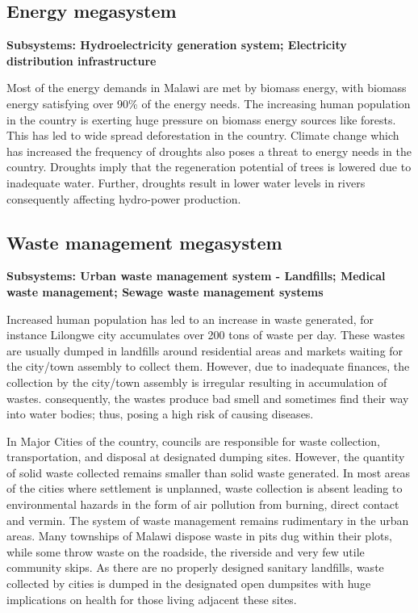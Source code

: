 \documentclass[
]{book}
\begin{document}
\hypertarget{energy-megasystem}{%
\subsection{Energy megasystem}\label{energy-megasystem}}

\textbf{Subsystems: Hydroelectricity generation system; Electricity distribution infrastructure}

Most of the energy demands in Malawi are met by biomass energy, with biomass energy satisfying over 90\% of the energy needs. The increasing human population in the country is exerting huge pressure on biomass energy sources like forests. This has led to wide spread deforestation in the country. Climate change which has increased the frequency of droughts also poses a threat to energy needs in the country. Droughts imply that the regeneration potential of trees is lowered due to inadequate water. Further, droughts result in lower water levels in rivers consequently affecting hydro-power production.

\hypertarget{waste-management-megasystem}{%
\subsection{Waste management megasystem}\label{waste-management-megasystem}}

\textbf{Subsystems: Urban waste management system - Landfills; Medical waste management; Sewage waste management systems}

Increased human population has led to an increase in waste generated, for instance Lilongwe city accumulates over 200 tons of waste per day. These wastes are usually dumped in landfills around residential areas and markets waiting for the city/town assembly to collect them. However, due to inadequate finances, the collection by the city/town assembly is irregular resulting in accumulation of wastes. consequently, the wastes produce bad smell and sometimes find their way into water bodies; thus, posing a high risk of causing diseases.

In Major Cities of the country, councils are responsible for waste collection, transportation, and disposal at designated dumping sites. However, the quantity of solid waste collected remains smaller than solid waste generated. In most areas of the cities where settlement is unplanned, waste collection is absent leading to environmental hazards in the form of air pollution from burning, direct contact and vermin. The system of waste management remains rudimentary in the urban areas. Many townships of Malawi dispose waste in pits dug within their plots, while some throw waste on the roadside, the riverside and very few utile community skips. As there are no properly designed sanitary landfills, waste collected by cities is dumped in the designated open dumpsites with huge implications on health for those living adjacent these sites.
\end{document}
